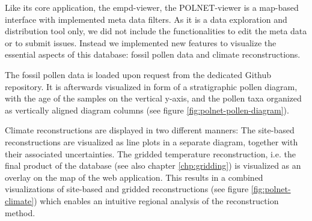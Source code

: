 \begin{refsection}
Like its core application, the \gls{empd}-viewer, the POLNET-viewer is a map-based interface with implemented meta data filters. As it is a data exploration and distribution tool only, we did not include the functionalities to edit the meta data or to submit issues. Instead we implemented new features to visualize the essential aspects of this database: fossil pollen data and climate reconstructions.

The fossil pollen data is loaded upon request from the dedicated Github repository. It is afterwards visualized in form of a stratigraphic pollen diagram, with the age of the samples on the vertical y-axis, and the pollen taxa organized as vertically aligned diagram columns (see figure \ref{fig:polnet-pollen-diagram}).

Climate reconstructions are displayed in two different manners: The site-based reconstructions are visualized as line plots in a separate diagram, together with their associated uncertainties. The gridded temperature reconstruction, i.e. the final product of the database (see also chapter \ref{chp:gridding}) is visualized as an overlay on the map of the web application. This results in a combined visualizations of site-based and gridded reconstructions (see figure \ref{fig:polnet-climate}) which enables an intuitive regional analysis of the reconstruction method.

\clearpage

\printbibliography[heading=subbibintoc]

\end{refsection}